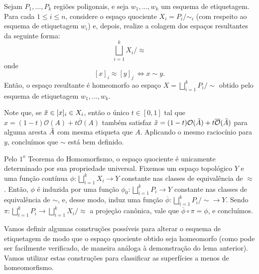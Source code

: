 \begin{lemma}\label{varias-etiquetagens-lemma}
    Sejam $P_1,\ldots, P_k$ regiões poligonais, e seja $w_1,\ldots, w_k$ um esquema de etiquetagem. Para cada $1\leq i\leq n$, considere o espaço quociente $X_i = P_i/\sim_i$ (com respeito ao esquema de etiquetagem $w_i$) e, depois, realize a colagem dos espaços resultantes da seguinte forma:
    \[\bigsqcup_{i=1}^k X_i/\approx\]
    onde
    \[[x]_i \approx [y]_j ~\Longleftrightarrow x \sim y.\]
    Então, o espaço resultante é homeomorfo ao espaço $X = \bigsqcup_{i=1}^k P_i/\sim$ obtido pelo esquema de etiquetagem $w_1,\ldots, w_k$.
    \begin{dem}
        Note que, se $\Tilde{x} \in [x]_i \in X_i$, então o único $t \in [0,1]$ tal que $x = (1-t) \mathcal{O}(A) + t \overline{\mathcal{O}}(A)$ também satisfaz $\Tilde{x} = (1-t) \mathcal{O}(\Tilde{A}) + t \overline{\mathcal{O}}(\Tilde{A})$ para alguma aresta $\Tilde{A}$ com mesma etiqueta que $A$. Aplicando o mesmo raciocínio para $y$, concluímos que $\sim$ está bem definido.
        
        Pelo $1^o$ Teorema do Homomorfismo, o espaço quociente é unicamente determinado por sua propriedade universal. Fixemos um espaço topológico $Y$ e uma função contínua $\phi: \bigsqcup_{i=1}^k X_i \to Y$ constante nas classes de equivalência de $\approx$. Então, $\phi$ é induzida por uma função $\phi_0: \bigsqcup_{i=1}^k P_i \to Y$ constante nas classes de equivalência de $\sim$, e, desse modo, induz uma função $\overline{\phi}: \bigsqcup_{i=1}^k P_i/\sim \to Y$. Sendo $\pi: \bigsqcup_{i=1}^k P_i \to \bigsqcup_{i=1}^k X_i/\approx$ a projeção canônica, vale que $\overline{\phi}\circ \pi = \phi$, e concluímos.
    \end{dem}
\end{lemma}

Vamos definir algumas construções possíveis para alterar o esquema de etiquetagem de modo que o espaço quociente obtido seja homeomorfo (como pode ser facilmente verificado, de maneira análoga à demonstração do lema anterior). Vamos utilizar estas construções para classificar as superfícies a menos de homeomorfismo.

